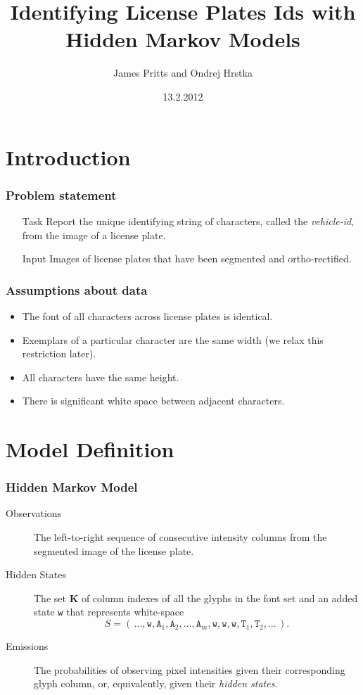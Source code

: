 \documentclass{beamer}
\title{Identifying License Plates Ids with Hidden Markov
    Models}
\author{ James Pritts and Ondrej Hrstka }
\institute[CTU FEE]{Czech Technical University in Prague - Faculty of Electrical Engineering}
\date{13.2.2012}
\begin{document}
\begin{frame}
  \titlepage
\end{frame}


\section{Introduction}

\begin{frame}
  \frametitle{Problem statement}

\begin{itemize}
\item[Task] Report the unique identifying string of characters, called
  the \emph{vehicle-id}, from the image of a license plate.

\item[Input] Images of license plates that have been segmented and
  ortho-rectified.
\end{itemize}

\end{frame}

\begin{frame}
  \frametitle{Assumptions about data}
\begin{itemize}
\item The font of all characters across license plates is identical.
\item Exemplars of a particular character are the same width (we relax this restriction later).
\item All characters have the same height.
\item There is significant white space between adjacent characters.
\end{itemize}
\end{frame}

\section{Model Definition}
\begin{frame}
  \frametitle{Hidden Markov Model}
\begin{description}
\item[Observations] The left-to-right sequence of consecutive intensity columns from
  the segmented image of the license plate.

\item[Hidden States] The set $\mathbf{K}$ of column
  indexes of all the glyphs in the font set and an added state \texttt{w}
  that represents white-space
\[S =
\left(\,\dots,\texttt{w},\texttt{A}_1,\texttt{A}_2,\ldots,\texttt{A}_{m},\texttt{w},\texttt{w},\texttt{w},\texttt{T}_1,\texttt{T}_2,\ldots\,\right).\]

\item[Emissions] The probabilities of observing pixel
  intensities given their corresponding glyph column, or,
  equivalently, given their \emph{hidden states}.

\end{description}
\end{frame}
\end{document}
